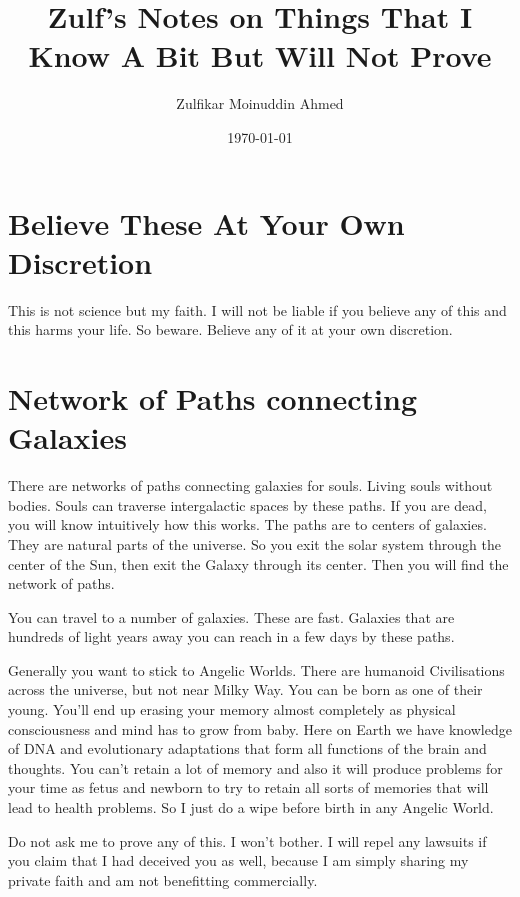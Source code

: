 \documentclass{amsart}
\title{Zulf's Notes on Things That I Know A Bit But Will Not Prove}
\author{Zulfikar Moinuddin Ahmed}
\date{\today}
\begin{document}
\maketitle

\section{Believe These At Your Own Discretion}

This is not science but my faith.  I will not be liable if you believe any of this and this harms your life.  So beware.  Believe any of it at your own discretion.

\section{Network of Paths connecting Galaxies}

There are networks of paths connecting galaxies for souls. Living souls without bodies.  Souls can traverse intergalactic spaces by these paths.  If you are dead, you will know intuitively how this works.  The paths are to centers of galaxies.  They are natural parts of the universe.  So you exit the solar system through the center of the Sun, then exit the Galaxy through its center.  Then you will find the network of paths.

You can travel to a number of galaxies.  These are fast.  Galaxies that are hundreds of light years away you can reach in a few days by these paths.  

Generally you want to stick to Angelic Worlds.  There are humanoid Civilisations across the universe, but not near Milky Way.  You can be born as one of their young.  You'll end up erasing your memory almost completely as physical consciousness and mind has to grow from baby.  Here on Earth we have knowledge of DNA and evolutionary adaptations that form all functions of the brain and thoughts.  You can't retain a lot of memory and also it will produce problems for your time as fetus and newborn to try to retain all sorts of memories that will lead to health problems.  So I just do a wipe before birth in any Angelic World.  

Do not ask me to prove any of this.  I won't bother.  I will repel any lawsuits if you claim that I had deceived you as well, because I am simply sharing my private faith and am not benefitting commercially.
\end{document}
